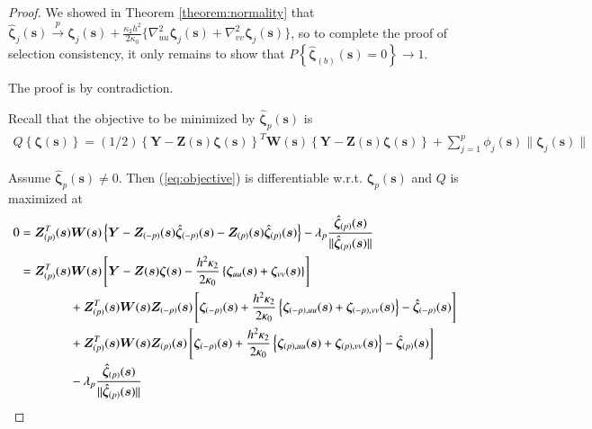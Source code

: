 \documentclass[authoryear, review, 11pt]{elsarticle}
\begin{document}
        \begin{proof} 
            We showed in Theorem \ref{theorem:normality} that $\hat{\bm{\zeta}}_j (\bm{s}) \xrightarrow{p} \bm{\zeta}_j (\bm{s}) + \frac{\kappa_2 h^2}{2 \kappa_0} \{ \nabla_{uu}^2 \bm{\zeta}_j (\bm{s}) + \nabla_{vv}^2 \bm{\zeta}_j (\bm{s}) \}$, so to complete the proof of selection consistency, it only remains to show that $P \left\{ \hat{\bm{\zeta}}_{(b)} (\bm{s}) = 0 \right\} \to 1$.
            
            The proof is by contradiction. 
      
            Recall that the objective to be minimized by $\hat{\bm{\zeta}}_p (\bm{s})$ is
            \begin{align}\label{eq:objective}
                Q \left\{ \bm{\zeta} (\bm{s}) \right\} = (1/2) \left\{ \bm{Y} - \bm{Z}(\bm{s}) \bm{\zeta} (\bm{s}) \right\}^T \bm{W}(\bm{s}) \left\{ \bm{Y} - \bm{Z}(\bm{s}) \bm{\zeta} (\bm{s}) \right\} + \sum_{j=1}^p \phi_j(\bm{s}) \| \bm{\zeta}_j (\bm{s}) \|
            \end{align}

            Assume $\hat{\bm{\zeta}}_p(\bm{s}) \ne 0$. Then (\ref{eq:objective}) is differentiable w.r.t. $\bm{\zeta}_p(\bm{s})$ and $Q$ is maximized at
            \begin{align}
                0 &= \bm{Z}_{(p)}^T(\bm{s}) \bm{W}(\bm{s}) \left\{ \bm{Y} - \bm{Z}_{(-p)}(\bm{s}) \hat{\bm{\zeta}}_{(-p)}(\bm{s}) - \bm{Z}_{(p)}(\bm{s}) \hat{\bm{\zeta}}_{(p)}(\bm{s}) \right\} - \lambda_p \frac{ \hat{\bm{\zeta}}_{(p)}(\bm{s}) }{\| \hat{\bm{\zeta}}_{(p)}(\bm{s}) \|} \notag \\
                &= \bm{Z}_{(p)}^T(\bm{s}) \bm{W}(\bm{s}) \left[ \bm{Y} - \bm{Z}(\bm{s}) \bm{\zeta}(\bm{s}) - \frac{h^2 \kappa_2}{2 \kappa_0} \left\{ \bm{\zeta}_{uu}(\bm{s}) + \bm{\zeta}_{vv}(\bm{s}) \right\} \right] \notag \\
                &\mkern+72mu+ \bm{Z}_{(p)}^T(\bm{s}) \bm{W}(\bm{s}) \bm{Z}_{(-p)}(\bm{s}) \left[ \bm{\zeta}_{(-p)}(\bm{s}) + \frac{h^2 \kappa_2}{2 \kappa_0} \left\{ \bm{\zeta}_{(-p),uu}(\bm{s}) + \bm{\zeta}_{(-p),vv}(\bm{s}) \right\} - \hat{\bm{\zeta}}_{(-p)}(\bm{s}) \right] \notag \\
                &\mkern+72mu+ \bm{Z}_{(p)}^T(\bm{s}) \bm{W}(\bm{s}) \bm{Z}_{(p)}(\bm{s}) \left[ \bm{\zeta}_{(-p)}(\bm{s}) + \frac{h^2 \kappa_2}{2 \kappa_0} \left\{ \bm{\zeta}_{(p),uu}(\bm{s}) + \bm{\zeta}_{(p),vv}(\bm{s}) \right\} - \hat{\bm{\zeta}}_{(p)}(\bm{s}) \right]  \notag \\
                &\mkern+72mu- \lambda_p \frac{ \hat{\bm{\zeta}}_{(p)}(\bm{s}) }{\| \hat{\bm{\zeta}}_{(p)}(\bm{s}) \|} \notag \\
            \end{align}
        

\end{proof}
\end{document}
